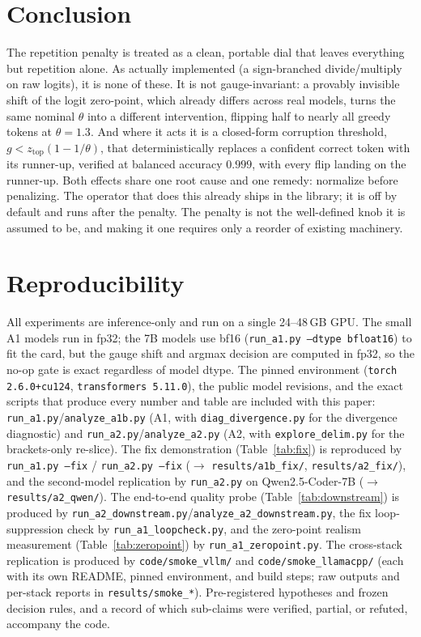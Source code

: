 \documentclass[11pt]{article}
\newcommand{\ztop}{z_{\mathrm{top}}}
\newcommand{\thp}{\theta}
\newcommand{\code}[1]{\texttt{#1}}
\begin{document}
\section{Conclusion}
\label{sec:conclusion}

The repetition penalty is treated as a clean, portable dial that leaves everything but repetition
alone. As actually implemented (a sign-branched divide/multiply on raw logits), it is none of these. It is not
gauge-invariant: a provably invisible shift of the logit zero-point, which already differs across
real models, turns the same nominal $\thp$ into a different intervention,
flipping half to nearly all greedy tokens at $\thp=1.3$. And where it acts it is a
closed-form corruption threshold, $g < \ztop(1-1/\thp)$, that deterministically replaces a
confident correct token with its runner-up, verified at balanced accuracy $0.999$, with
every flip landing on the runner-up. Both effects share one root cause and one remedy:
normalize before penalizing. The operator that does this already ships in the library; it is
off by default and runs after the penalty. The penalty is not the well-defined knob it is
assumed to be, and making it one requires only a reorder of existing machinery.

\section*{Reproducibility}
All experiments are inference-only and run on a single 24--48\,GB GPU. The small A1 models run
in fp32; the 7B models use bf16 (\code{run\_a1.py --dtype bfloat16}) to fit the card, but the
gauge shift and argmax decision are computed in fp32, so the no-op gate is exact regardless of
model dtype. The pinned environment
(\code{torch 2.6.0+cu124}, \code{transformers 5.11.0}), the public model revisions, and the
exact scripts that produce every number and table are included with this paper:
\code{run\_a1.py}/\code{analyze\_a1b.py} (A1, with \code{diag\_divergence.py} for the
divergence diagnostic) and \code{run\_a2.py}/\code{analyze\_a2.py} (A2, with
\code{explore\_delim.py} for the brackets-only re-slice). The fix demonstration
(Table~\ref{tab:fix}) is reproduced by \code{run\_a1.py --fix} / \code{run\_a2.py --fix}
($\to$ \code{results/a1b\_fix/}, \code{results/a2\_fix/}), and the second-model replication
by \code{run\_a2.py} on Qwen2.5-Coder-7B ($\to$ \code{results/a2\_qwen/}). The end-to-end
quality probe (Table~\ref{tab:downstream}) is produced by
\code{run\_a2\_downstream.py}/\code{analyze\_a2\_downstream.py}, the fix loop-suppression check
by \code{run\_a1\_loopcheck.py}, and the zero-point realism measurement
(Table~\ref{tab:zeropoint}) by \code{run\_a1\_zeropoint.py}. The cross-stack replication is
produced by \code{code/smoke\_vllm/} and \code{code/smoke\_llamacpp/} (each with its own README,
pinned environment, and build steps; raw outputs and per-stack reports in
\code{results/smoke\_*}). Pre-registered hypotheses and
frozen decision rules, and a record of which sub-claims were verified, partial, or
refuted, accompany the code.
\end{document}
